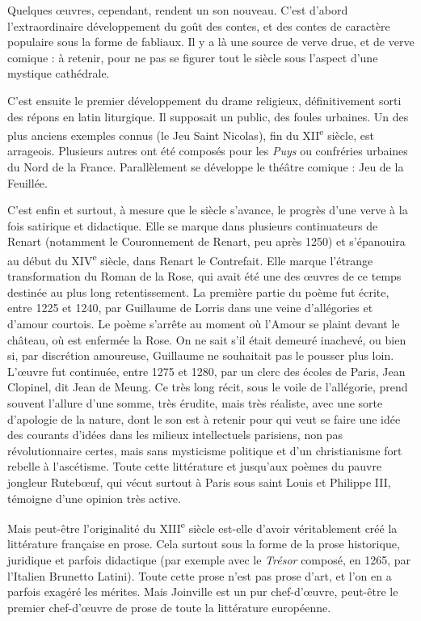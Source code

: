 \documentclass[french,twoside]{book} %
\begin{document}
Quelques œuvres, cependant, rendent un son nouveau. C’est d’abord l’extraordinaire développement du goût des contes, et des contes de caractère populaire sous la forme de fabliaux. Il y a là une source de verve drue, et de verve comique : à retenir, pour ne pas se figurer tout le siècle sous l’aspect d’une mystique cathédrale.\par
C’est ensuite le premier développement du drame religieux, définitivement sorti des répons en latin liturgique. Il supposait un public, des foules urbaines. Un des plus anciens exemples connus (le Jeu Saint Nicolas), fin du XII\textsuperscript{e} siècle, est arrageois. Plusieurs autres ont été composés pour les \emph{Puys} ou confréries urbaines du Nord de la France. Parallèlement se développe le théâtre comique : Jeu de la Feuillée.\par
C’est enfin et surtout, à mesure que le siècle s’avance, le progrès d’une verve à la fois satirique et didactique. Elle se marque dans plusieurs continuateurs de Renart (notamment le Couronnement de Renart, peu après 1250) et s’épanouira au début du XIV\textsuperscript{e} siècle, dans Renart le Contrefait. Elle marque l’étrange transformation du Roman de la Rose, qui avait été une des œuvres de ce temps destinée au plus long retentissement. La première partie du poème fut écrite, entre 1225 et 1240, par Guillaume de Lorris dans une veine d’allégories et d’amour courtois. Le poème s’arrête au moment où l’Amour se plaint devant le château, où est enfermée  
\label{p123} la Rose. On ne sait s’il était demeuré inachevé, ou bien si, par discrétion amoureuse, Guillaume ne souhaitait pas le pousser plus loin. L’œuvre fut continuée, entre 1275 et 1280, par un clerc des écoles de Paris, Jean Clopinel, dit Jean de Meung. Ce très long récit, sous le voile de l’allégorie, prend souvent l’allure d’une somme, très érudite, mais très réaliste, avec une sorte d’apologie de la nature, dont le son est à retenir pour qui veut se faire une idée des courants d’idées dans les milieux intellectuels parisiens, non pas révolutionnaire certes, mais sans mysticisme politique et d’un christianisme fort rebelle à l’ascétisme. Toute cette littérature et jusqu’aux poèmes du pauvre jongleur Rutebœuf, qui vécut surtout à Paris sous saint Louis et Philippe III, témoigne d’une opinion très active.\par
Mais peut-être l’originalité du XIII\textsuperscript{e} siècle est-elle d’avoir véritablement créé la littérature française en prose. Cela surtout sous la forme de la prose historique, juridique et parfois didactique (par exemple avec le {\itshape Trésor} composé, en 1265, par l’Italien Brunetto Latini). Toute cette prose n’est pas prose d’art, et l’on en a parfois exagéré les mérites. Mais Joinville est un pur chef-d’œuvre, peut-être le premier chef-d’œuvre de prose de toute la littérature européenne.\par
\end{document}
